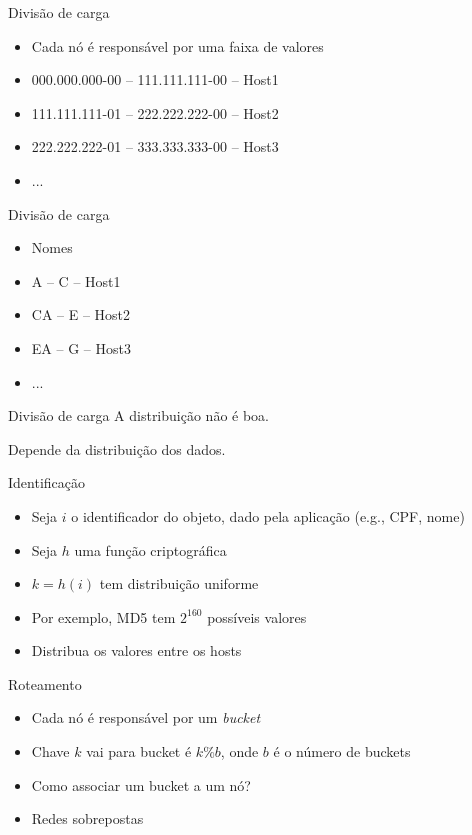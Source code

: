 \begin{frame}{Divisão de carga}
\begin{itemize}
	\item Cada nó é responsável por uma faixa de valores
	\item 000.000.000-00 -- 111.111.111-00 -- Host1
	\item 111.111.111-01 -- 222.222.222-00 -- Host2
	\item 222.222.222-01 -- 333.333.333-00 -- Host3
	\item ...
\end{itemize}
\end{frame}

\begin{frame}{Divisão de carga}
\begin{itemize}
	\item Nomes
	\item A -- C -- Host1
	\item CA -- E -- Host2
	\item EA -- G -- Host3
	\item ...
\end{itemize}
\end{frame}

\begin{frame}{Divisão de carga}
A distribuição não é boa. 

Depende da distribuição dos dados.
\end{frame}



\begin{frame}{Identificação}
\begin{itemize}
	\item Seja $i$ o identificador do objeto, dado pela aplicação (e.g., CPF, nome)
	\item Seja $h$ uma função criptográfica
	\item $k = h(i)$ tem distribuição uniforme
	\item Por exemplo, MD5 tem $2^{160}$ possíveis valores
	\item Distribua os valores entre os hosts
\end{itemize}
\end{frame}

\begin{frame}{Roteamento}
\begin{itemize}
	\item Cada nó é responsável por um \emph{bucket}
	\item Chave $k$ vai para bucket é $k \% b$, onde $b$ é o número de buckets
	\item Como associar um bucket a um nó?
	\item Redes sobrepostas
\end{itemize}
\end{frame}

